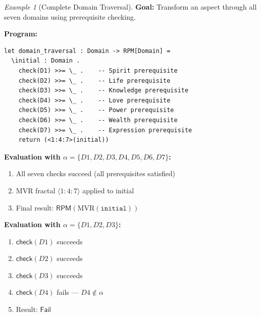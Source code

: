 \documentclass[11pt,twoside,openright]{book}
\theoremstyle{definition}
\theoremstyle{plain}
\theoremstyle{remark}
\newtheorem{example}[definition]{Example}
\newcommand{\Failed}{\mathsf{Fail}}
\begin{document}
\begin{example}[Complete Domain Traversal]
\label{ex:domain-traversal}
\textbf{Goal:} Transform an aspect through all seven domains using prerequisite checking.

\textbf{Program:}
\begin{verbatim}
let domain_traversal : Domain -> RPM[Domain] =
  \initial : Domain .
    check(D1) >>= \_ .    -- Spirit prerequisite
    check(D2) >>= \_ .    -- Life prerequisite
    check(D3) >>= \_ .    -- Knowledge prerequisite
    check(D4) >>= \_ .    -- Love prerequisite
    check(D5) >>= \_ .    -- Power prerequisite
    check(D6) >>= \_ .    -- Wealth prerequisite
    check(D7) >>= \_ .    -- Expression prerequisite
    return (<1:4:7>(initial))
\end{verbatim}

\textbf{Evaluation with $\alpha = \{D1, D2, D3, D4, D5, D6, D7\}$:}
\begin{enumerate}
\item All seven checks succeed (all prerequisites satisfied)
\item MVR fractal $\langle 1:4:7 \rangle$ applied to initial
\item Final result: $\mathsf{RPM}(\text{MVR}(\texttt{initial}))$
\end{enumerate}

\textbf{Evaluation with $\alpha = \{D1, D2, D3\}$:}
\begin{enumerate}
\item $\mathsf{check}(D1)$ succeeds
\item $\mathsf{check}(D2)$ succeeds
\item $\mathsf{check}(D3)$ succeeds
\item $\mathsf{check}(D4)$ fails — $D4 \notin \alpha$
\item Result: $\Failed$
\end{enumerate}
\end{example}
\end{document}
